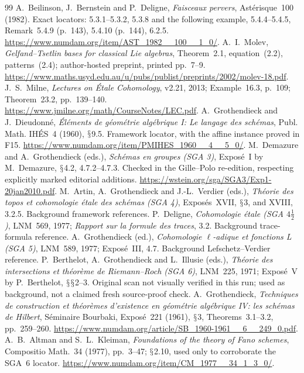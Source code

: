 \documentclass[11pt,a4paper]{article}
\renewcommand{\S}{\ensuremath{\mathsection}}
\theoremstyle{named}\newtheorem{finding}{Finding}[section]
\theoremstyle{definition}\newtheorem{definition}[finding]{Definition}
\theoremstyle{remark}\newtheorem{remark}[finding]{Remark}
\begin{document}
\begin{thebibliography}{99}
 A.~Beilinson, J.~Bernstein and P.~Deligne, \emph{Faisceaux pervers}, Ast\'erisque~100 (1982). Exact locators: 5.3.1--5.3.2, 5.3.8 and the following example, 5.4.4--5.4.5, Remark~5.4.9 (p.~143), 5.4.10 (p.~144), 6.2.5. \url{https://www.numdam.org/item/AST_1982__100__1_0/}.
 A.~I.~Molev, \emph{Gelfand--Tsetlin bases for classical Lie algebras}, Theorem~2.1, equation~(2.2), patterns~(2.4); author-hosted preprint, printed pp.~7--9. \url{https://www.maths.usyd.edu.au/u/pubs/publist/preprints/2002/molev-18.pdf}.
 J.~S.~Milne, \emph{Lectures on \'Etale Cohomology}, v2.21, 2013; Example~16.3, p.~109; Theorem~23.2, pp.~139--140. \url{https://www.jmilne.org/math/CourseNotes/LEC.pdf}.
 A.~Grothendieck and J.~Dieudonn\'e, \emph{\'El\'ements de g\'eom\'etrie alg\'ebrique I: Le langage des sch\'emas}, Publ. Math. IH\'ES~4 (1960), \S9.5. Framework locator, with the affine instance proved in F15. \url{https://www.numdam.org/item/PMIHES_1960__4__5_0/}.
 M.~Demazure and A.~Grothendieck (eds.), \emph{Sch\'emas en groupes (SGA 3)}, Expos\'e~I by M.~Demazure, \S4.2, 4.7.2--4.7.3. Checked in the Gille--Polo re-edition, respecting explicitly marked editorial additions. \url{https://wstein.org/sga/SGA3/Exp1-20jan2010.pdf}.
 M.~Artin, A.~Grothendieck and J.-L.~Verdier (eds.), \emph{Th\'eorie des topos et cohomologie \'etale des sch\'emas (SGA 4)}, Expos\'es~XVII, \S3, and XVIII, 3.2.5. Background framework references.
 P.~Deligne, \emph{Cohomologie \'etale (SGA $4\frac12$)}, LNM~569, 1977; \emph{Rapport sur la formule des traces}, 3.2. Background trace-formula reference.
 A.~Grothendieck (ed.), \emph{Cohomologie \(\ell\)-adique et fonctions L (SGA 5)}, LNM~589, 1977; Expos\'e~III, 4.7. Background Lefschetz--Verdier reference.
 P.~Berthelot, A.~Grothendieck and L.~Illusie (eds.), \emph{Th\'eorie des intersections et th\'eor\`eme de Riemann--Roch (SGA 6)}, LNM~225, 1971; Expos\'e~V by P.~Berthelot, \S\S2--3. Original scan not visually verified in this run; used as background, not a claimed fresh source-proof check.
 A.~Grothendieck, \emph{Techniques de construction et th\'eor\`emes d'existence en g\'eom\'etrie alg\'ebrique IV: les sch\'emas de Hilbert}, S\'eminaire Bourbaki, Expos\'e~221 (1961), \S3, Theorems~3.1--3.2, pp.~259--260. \url{https://www.numdam.org/article/SB_1960-1961__6__249_0.pdf}.
 A.~B.~Altman and S.~L.~Kleiman, \emph{Foundations of the theory of Fano schemes}, Compositio Math.~34 (1977), pp.~3--47; \S2.10, used only to corroborate the SGA~6 locator. \url{https://www.numdam.org/item/CM_1977__34_1_3_0/}.

\end{thebibliography}
\end{document}
